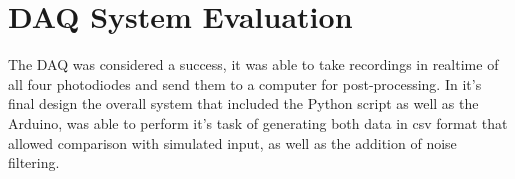 \section{\acf{DAQ} System Evaluation}
The \ac{DAQ} was considered a success, it was able to take recordings in realtime of all four photodiodes and send them to a computer for post-processing. In it's final design the overall system that included the Python script as well as the Arduino, was able to perform it's task of generating both data in csv format that allowed comparison with simulated input, as well as the addition of noise filtering. 



%         





